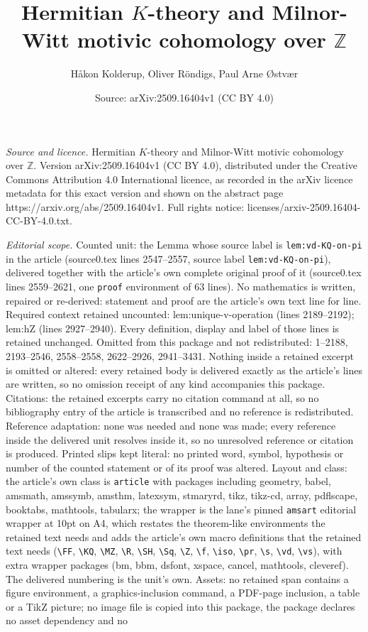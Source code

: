 \documentclass[10pt,a4paper]{amsart}
\title[Hermitian $K$-theory and Milnor-Witt motivic cohomology over]{Hermitian $K$-theory and Milnor-Witt motivic cohomology over $\mathbb Z$}
\author{H{\aa}kon Kolderup, Oliver R\"ondigs, Paul Arne {\O}stv{\ae}r}
\date{Source: arXiv:2509.16404v1 (CC BY 4.0)}
\begin{document}
\maketitle

\noindent\emph{Source and licence.} Hermitian $K$-theory and Milnor-Witt motivic cohomology over $\mathbb Z$. Version arXiv:2509.16404v1 (CC BY 4.0), distributed under the Creative Commons Attribution 4.0 International licence, as recorded in the arXiv licence metadata for this exact version and shown on the abstract page https://arxiv.org/abs/2509.16404v1. Full rights notice: licenses/arxiv-2509.16404-CC-BY-4.0.txt.\par\smallskip

\noindent\textit{Editorial scope.} Counted unit: the Lemma whose source label is \texttt{lem:vd-KQ-on-pi} in the article (source0.tex lines 2547--2557, source label \texttt{lem:vd-KQ-on-pi}), delivered together with the article's own complete original proof of it (source0.tex lines 2559--2621, one \texttt{proof} environment of 63 lines). No mathematics is written, repaired or re-derived: statement and proof are the article's own text line for line. Required context retained uncounted: lem:unique-v-operation (lines 2189--2192); lem:hZ (lines 2927--2940). Every definition, display and label of those lines is retained unchanged. Omitted from this package and not redistributed: 1--2188, 2193--2546, 2558--2558, 2622--2926, 2941--3431. Nothing inside a retained excerpt is omitted or altered: every retained body is delivered exactly as the article's lines are written, so no omission receipt of any kind accompanies this package. Citations: the retained excerpts carry no citation command at all, so no bibliography entry of the article is transcribed and no reference is redistributed. Reference adaptation: none was needed and none was made; every reference inside the delivered unit resolves inside it, so no unresolved reference or citation is produced. Printed slips kept literal: no printed word, symbol, hypothesis or number of the counted statement or of its proof was altered. Layout and class: the article's own class is \texttt{article} with packages including geometry, babel, amsmath, amssymb, amsthm, latexsym, stmaryrd, tikz, tikz-cd, array, pdflscape, booktabs, mathtools, tabularx; the wrapper is the lane's pinned \texttt{amsart} editorial wrapper at 10pt on A4, which restates the theorem-like environments the retained text needs and adds the article's own macro definitions that the retained text needs (\texttt{\textbackslash FF}, \texttt{\textbackslash KQ}, \texttt{\textbackslash MZ}, \texttt{\textbackslash R}, \texttt{\textbackslash SH}, \texttt{\textbackslash Sq}, \texttt{\textbackslash Z}, \texttt{\textbackslash f}, \texttt{\textbackslash iso}, \texttt{\textbackslash pr}, \texttt{\textbackslash s}, \texttt{\textbackslash vd}, \texttt{\textbackslash vs}), with extra wrapper packages (bm, bbm, dsfont, xspace, cancel, mathtools, cleveref). The delivered numbering is the unit's own. Assets: no retained span contains a figure environment, a graphics-inclusion command, a PDF-page inclusion, a table or a TikZ picture; no image file is copied into this package, the package declares no asset dependency and no 
\end{document}
